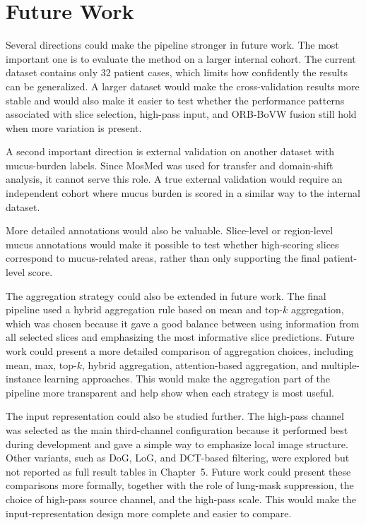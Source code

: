 \section{Future Work}
Several directions could make the pipeline stronger in future work. The most important one is to evaluate the method on a larger internal cohort. The current dataset contains only 32 patient cases, which limits how confidently the results can be generalized. A larger dataset would make the cross-validation results more stable and would also make it easier to test whether the performance patterns associated with slice selection, high-pass input, and ORB-BoVW fusion still hold when more variation is present. 

A second important direction is external validation on another dataset with mucus-burden labels. Since MosMed was used for transfer and domain-shift analysis, it cannot serve this role. A true external validation would require an independent cohort where mucus burden is scored in a similar way to the internal dataset.

More detailed annotations would also be valuable. Slice-level or region-level mucus annotations would make it possible to test whether high-scoring slices correspond to mucus-related areas, rather than only supporting the final patient-level score.

The aggregation strategy could also be extended in future work. The final pipeline used a hybrid aggregation rule based on mean and top-\(k\) aggregation, which was chosen because it gave a good balance between using information from all selected slices and emphasizing the most informative slice predictions. Future work could present a more detailed comparison of aggregation choices, including mean, max, top-\(k\), hybrid aggregation, attention-based aggregation, and multiple-instance learning approaches. This would make the aggregation part of the pipeline more transparent and help show when each strategy is most useful.

The input representation could also be studied further. The high-pass channel was selected as the main third-channel configuration because it performed best during development and gave a simple way to emphasize local image structure. Other variants, such as DoG, LoG, and DCT-based filtering, were explored but not reported as full result tables in Chapter~5. Future work could present these comparisons more formally, together with the role of lung-mask suppression, the choice of high-pass source channel, and the high-pass scale. This would make the input-representation design more complete and easier to compare.


